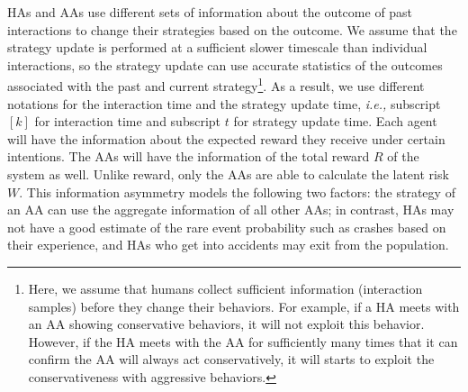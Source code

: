 \documentclass[letterpaper]{article} %
\newcommand{\ie}{\textit{i.e., }}
\begin{document}
HAs and AAs use different sets of information about the outcome of past interactions to change their strategies based on the outcome. We assume that the strategy update is performed at a sufficient slower timescale than individual interactions, so the strategy update can use accurate statistics of the outcomes associated with the past and current strategy\footnote{Here, we assume that humans collect sufficient information (interaction samples) before they change their behaviors. For example, if a HA meets with an AA showing conservative behaviors, it will not exploit this behavior. However, if the HA meets with the AA for sufficiently many times that it can confirm the AA will always act conservatively, it will starts to exploit the conservativeness with aggressive behaviors.}. As a result, we use different notations for the interaction time and the strategy update time, \ie subscript $[k]$ for interaction time and subscript $t$ for strategy update time. Each agent will have the information about the expected reward they receive under certain intentions. The AAs will have the information of the total reward $R$ of the system as well. Unlike reward, only the AAs are able to calculate the latent risk $W$. This information asymmetry models the following two factors: the strategy of an AA can use the aggregate information of all other AAs; in contrast, HAs may not have a good estimate of the rare event probability such as crashes based on their experience, and HAs who get into accidents may exit from the population.
\end{document}
